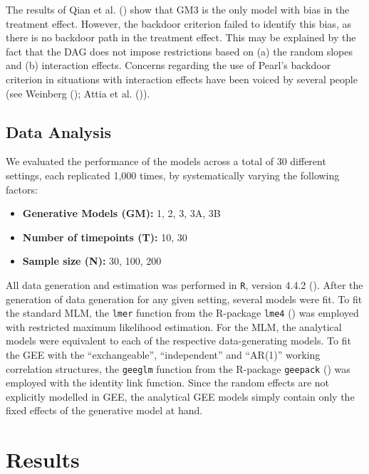 \documentclass[
  12pt,
  a4paper,
]{article}
\begin{document}
The results of Qian et al. () show that GM3
is the only model with bias in the treatment effect. However, the
backdoor criterion failed to identify this bias, as there is no backdoor
path in the treatment effect. This may be explained by the fact that the
DAG does not impose restrictions based on (a) the random slopes and (b)
interaction effects. Concerns regarding the use of Pearl's backdoor
criterion in situations with interaction effects have been voiced by
several people (see Weinberg (); Attia
et al. ()).

\subsection{Data Analysis}\label{data-analysis}

We evaluated the performance of the models across a total of 30
different settings, each replicated 1,000 times, by systematically
varying the following factors:

\begin{itemize}
\item
  \textbf{Generative Models (GM):} 1, 2, 3, 3A, 3B
\item
  \textbf{Number of timepoints (T):} 10, 30
\item
  \textbf{Sample size (N):} 30, 100, 200
\end{itemize}

All data generation and estimation was performed in \texttt{R}, version
4.4.2 (). After the generation
of data generation for any given setting, several models were fit. To
fit the standard MLM, the \texttt{lmer} function from the R-package
\texttt{lme4} () was
employed with restricted maximum likelihood estimation. For the MLM, the
analytical models were equivalent to each of the respective
data-generating models. To fit the GEE with the ``exchangeable'',
``independent'' and ``AR(1)'' working correlation structures, the
\texttt{geeglm} function from the R-package \texttt{geepack}
() was employed with the
identity link function. Since the random effects are not explicitly
modelled in GEE, the analytical GEE models simply contain only the fixed
effects of the generative model at hand.

\section{Results}\label{results}
\end{document}
